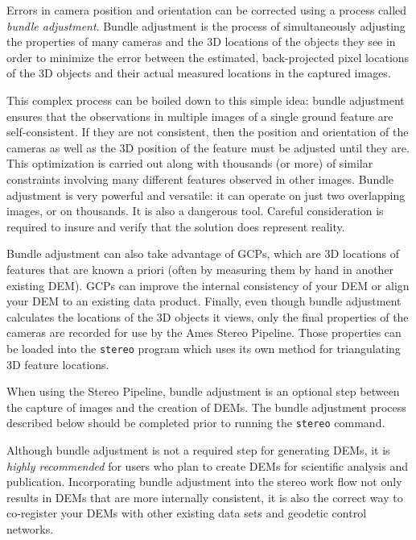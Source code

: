 Errors in camera position and orientation can be corrected using a
process called \emph{bundle adjustment}. Bundle adjustment is the
process of simultaneously adjusting the properties of many cameras and
the 3D locations of the objects they see in order to minimize the error
between the estimated, back-projected pixel locations of the 3D objects
and their actual measured locations in the captured images.

This complex process can be boiled down to this simple idea: bundle
adjustment ensures that the observations in multiple images of a
single ground feature are self-consistent. If they are not consistent,
then the position and orientation of the cameras as well as the 3D
position of the feature must be adjusted until they are.  This
optimization is carried out along with thousands (or more) of similar
constraints involving many different features observed in other
images.  Bundle adjustment is very powerful and versatile: it can
operate on just two overlapping images, or on thousands. It is also a
dangerous tool. Careful consideration is required to insure and
verify that the solution does represent reality.

Bundle adjustment can also take advantage of \acp{GCP}, which are
3D locations of features that are known a priori (often by measuring
them by hand in another existing \ac{DEM}). \acp{GCP} can improve the internal
consistency of your \ac{DEM} or align your \ac{DEM} to an existing data
product. Finally, even though bundle adjustment calculates the
locations of the 3D objects it views, only the final properties of
the cameras are recorded for use by the Ames Stereo Pipeline. Those
properties can be loaded into the \texttt{stereo} program which
uses its own method for triangulating 3D feature locations.

When using the Stereo Pipeline, bundle adjustment is an optional step
between the capture of images and the creation of \acp{DEM}. The bundle
adjustment process described below should be completed prior to
running the \texttt{stereo} command.

Although bundle adjustment is not a required step for generating
\acp{DEM}, it is {\em highly recommended} for users who plan to
create \acp{DEM} for scientific analysis and publication.  Incorporating
bundle adjustment into the stereo work flow not only results in
\acp{DEM} that are more internally consistent, it is also the correct
way to co-register your \acp{DEM} with other existing data sets and
geodetic control networks.

